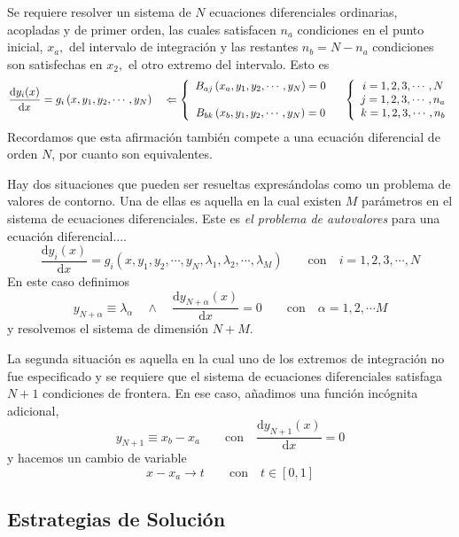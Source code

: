 \documentclass[spanish,titlepage,11pt]{article}
\begin{document}
Se requiere resolver un sistema de $N$ ecuaciones diferenciales ordinarias,
acopladas y de primer orden, las cuales satisfacen $n_{a}$ condiciones en el
punto inicial, $x_{a},$ del intervalo de integraci\'{o}n y las restantes
$n_{b}=N-n_{a}$ condiciones son satisfechas en $x_{2},$ el otro extremo del
intervalo. Esto es
\[
\frac{\mathrm{d}y_{i}(x)}{\mathrm{d}x}=g_{i}\left(  x,y_{1},y_{2},\cdots
,y_{N}\right)  \quad\Leftarrow\left\{
\begin{array}
[c]{c}%
B_{aj}\left(  x_{a},y_{1},y_{2},\cdots,y_{N}\right)  =0\\
\\
B_{bk}\left(  x_{b},y_{1},y_{2},\cdots,y_{N}\right)  =0
\end{array}
\right.  \quad\left\{
\begin{array}
[c]{c}%
i=1,2,3,\cdots,N\\
j=1,2,3,\cdots,n_{a}\\
k=1,2,3,\cdots,n_{b}%
\end{array}
\right.
\]
Recordamos que esta afirmaci\'{o}n tambi\'{e}n compete a una ecuaci\'{o}n
diferencial de orden $N$, por cuanto son equivalentes.

Hay dos situaciones que pueden ser resueltas expres\'{a}ndolas como un
problema de valores de contorno. Una de ellas es aquella en la cual existen
$M$ par\'{a}metros en el sistema de ecuaciones diferenciales. Este es
\textit{el problema de autovalores} para una ecuaci\'{o}n diferencial....
\[
\frac{\mathrm{d}y_{i}(x)}{\mathrm{d}x}=g_{i}\left(  x,y_{1},y_{2},\cdots
,y_{N},\lambda_{1},\lambda_{2},\cdots,\lambda_{M}\right)  \qquad
\mathrm{con}\quad i=1,2,3,\cdots,N
\]
En este caso definimos
\[
y_{N+\alpha}\equiv\lambda_{\alpha}\quad\wedge\quad\frac{\mathrm{d}y_{N+\alpha
}(x)}{\mathrm{d}x}=0\qquad\mathrm{con}\quad\alpha=1,2,\cdots M
\]
y resolvemos el sistema de dimensi\'{o}n $N+M.$

La segunda situaci\'{o}n es aquella en la cual uno de los extremos de
integraci\'{o}n no fue especificado y se requiere que el sistema de ecuaciones
diferenciales satisfaga $N+1$ condiciones de frontera. En ese caso,
a\~{n}adimos una funci\'{o}n inc\'{o}gnita adicional,
\[
y_{N+1}\equiv x_{b}-x_{a}\qquad\mathrm{con\quad}\frac{\mathrm{d}y_{N+1}%
(x)}{\mathrm{d}x}=0
\]
y hacemos un cambio de variable
\[
x-x_{a}\rightarrow t\qquad\mathrm{con\quad}t\in\left[  0,1\right]
\]

\subsection{Estrategias de Soluci\'{o}n}
\end{document}
